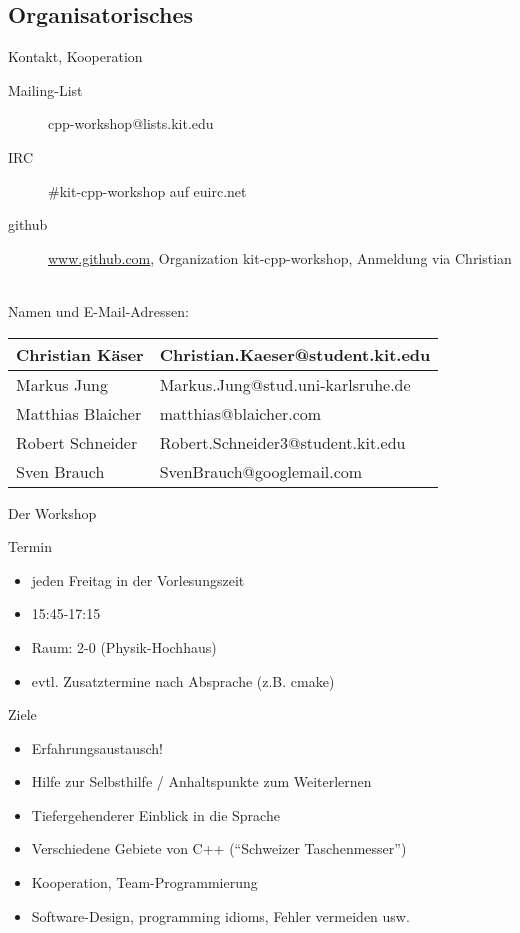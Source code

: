 \subsection{Organisatorisches}

\begin{frame}{Kontakt, Kooperation}
	\begin{description}
		\item[Mailing-List] cpp-workshop@lists.kit.edu
		\item[IRC] \#kit-cpp-workshop auf euirc.net
		\item[github]	\url{www.github.com}, Organization kit-cpp-workshop, Anmeldung via Christian
	\end{description}
	\ \\
	
	Namen und E-Mail-Adressen:
	\begin{table}
		\begin{tabular}{l|l}
			Christian Käser	&	Christian.Kaeser@student.kit.edu	\\
			\hline
			Markus Jung		&	Markus.Jung@stud.uni-karlsruhe.de	\\
			\hline
			Matthias Blaicher	&	matthias@blaicher.com	\\
			\hline
			Robert Schneider	&	Robert.Schneider3@student.kit.edu	\\
			\hline
			Sven Brauch	&	SvenBrauch@googlemail.com	\\
		\end{tabular}
	\end{table}
\end{frame}

\begin{frame}{Der Workshop}
	\begin{block}{Termin}
		\begin{itemize}
			\item jeden Freitag in der Vorlesungszeit
			\item 15:45-17:15
			\item Raum: 2-0 (Physik-Hochhaus)
			\item evtl. Zusatztermine nach Absprache (z.B. cmake)
		\end{itemize}
	\end{block}
	\pause
	\begin{block}{Ziele}
		\begin{itemize}
			\item Erfahrungsaustausch!
			\item Hilfe zur Selbsthilfe / Anhaltspunkte zum Weiterlernen
			\item Tiefergehenderer Einblick in die Sprache
			\item Verschiedene Gebiete von C++ (\enquote{Schweizer Taschenmesser})
			\item Kooperation, Team-Programmierung
			\item Software-Design, programming idioms, Fehler vermeiden usw.
		\end{itemize}
	\end{block}
\end{frame}

